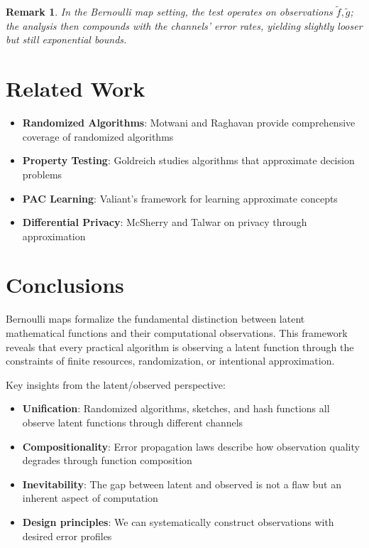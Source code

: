 \documentclass[11pt,final,hidelinks]{article}
\newtheorem{remark}[theorem]{Remark}
\newcommand{\obs}[1]{\widetilde{#1}}  %
\begin{document}
\begin{remark}
In the Bernoulli map setting, the test operates on observations $\obs{f},\obs{g}$; the analysis then compounds with the channels' error rates, yielding slightly looser but still exponential bounds.
\end{remark}

\section{Related Work}

\begin{itemize}
    \item \textbf{Randomized Algorithms}: Motwani and Raghavan \cite{motwani1995} provide comprehensive coverage of randomized algorithms
    \item \textbf{Property Testing}: Goldreich \cite{goldreich2017} studies algorithms that approximate decision problems
    \item \textbf{PAC Learning}: Valiant's framework \cite{valiant1984} for learning approximate concepts
    \item \textbf{Differential Privacy}: McSherry and Talwar \cite{mcsherry2007} on privacy through approximation
\end{itemize}

\section{Conclusions}

Bernoulli maps formalize the fundamental distinction between latent mathematical functions and their computational observations. This framework reveals that every practical algorithm is observing a latent function through the constraints of finite resources, randomization, or intentional approximation.

Key insights from the latent/observed perspective:
\begin{itemize}
    \item \textbf{Unification}: Randomized algorithms, sketches, and hash functions all observe latent functions through different channels
    \item \textbf{Compositionality}: Error propagation laws describe how observation quality degrades through function composition
    \item \textbf{Inevitability}: The gap between latent and observed is not a flaw but an inherent aspect of computation
    \item \textbf{Design principles}: We can systematically construct observations with desired error profiles
\end{itemize}
\end{document}
